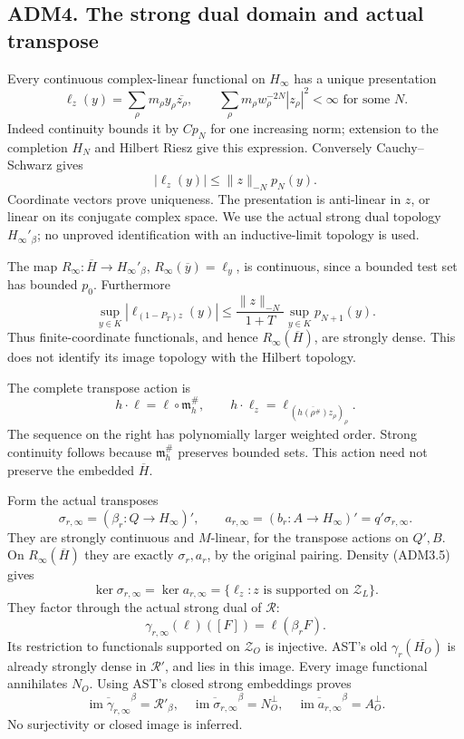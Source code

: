 \subsection{ADM4. The strong dual domain and actual
transpose}\label{adm4.-the-strong-dual-domain-and-actual-transpose}

Every continuous complex-linear functional on \(H_\infty\) has a unique
presentation \[
\ell_z(y)=\sum_\rho m_\rho y_\rho\overline{z_\rho},\qquad
\sum_\rho m_\rho w_\rho^{-2N}|z_\rho|^2<\infty
\text{ for some }N.
\tag{ADM4.1}
\] Indeed continuity bounds it by \(Cp_N\) for one increasing norm;
extension to the completion \(H_N\) and Hilbert Riesz give this
expression. Conversely Cauchy--Schwarz gives \[
|\ell_z(y)|\le\|z\|_{-N}p_N(y).
\tag{ADM4.2}
\] Coordinate vectors prove uniqueness. The presentation is anti-linear
in \(z\), or linear on its conjugate complex space. We use the actual
strong dual topology \(H_\infty'{}_\beta\); no unproved identification
with an inductive-limit topology is used.

The map \(R_\infty:\overline H\to H_\infty'{}_\beta\),
\(R_\infty(\overline y)=\ell_y\), is continuous, since a bounded test
set has bounded \(p_0\). Furthermore \[
\sup_{y\in K}|\ell_{(1-P_T)z}(y)|
\le\frac{\|z\|_{-N}}{1+T}\sup_{y\in K}p_{N+1}(y).
\tag{ADM4.3}
\] Thus finite-coordinate functionals, and hence
\(R_\infty(\overline H)\), are strongly dense. This does not identify
its image topology with the Hilbert topology.

The complete transpose action is \[
h\cdot\ell=\ell\circ\mathfrak m_h^\#,\qquad
h\cdot\ell_z=\ell_{\,(\overline{h(\rho^\#)}z_\rho)_\rho}.
\tag{ADM4.4}
\] The sequence on the right has polynomially larger weighted order.
Strong continuity follows because \(\mathfrak m_h^\#\) preserves bounded
sets. This action need not preserve the embedded \(\overline H\).

Form the actual transposes \[
\sigma_{r,\infty}=(\beta_r:Q\to H_\infty)',\qquad
a_{r,\infty}=(b_r:A\to H_\infty)'=q'\sigma_{r,\infty}.
\tag{ADM4.5}
\] They are strongly continuous and \(M\)-linear, for the transpose
actions on \(Q',B\). On \(R_\infty(\overline H)\) they are exactly
\(\sigma_r,a_r\), by the original pairing. Density (ADM3.5) gives \[
\ker\sigma_{r,\infty}=\ker a_{r,\infty}
=\{\ell_z:z\text{ is supported on }\mathscr Z_L\}.
\tag{ADM4.6}
\] They factor through the actual strong dual of \(\mathcal R\): \[
\gamma_{r,\infty}(\ell)([F])=\ell(\beta_rF).
\tag{ADM4.7}
\] Its restriction to functionals supported on \(\mathscr Z_O\) is
injective. AST's old \(\gamma_r(\overline{H_O})\) is already strongly
dense in \(\mathcal R'\), and lies in this image. Every image functional
annihilates \(N_O\). Using AST's closed strong embeddings proves \[
\overline{\operatorname{im}\gamma_{r,\infty}}^\beta=\mathcal R'_\beta,\quad
\overline{\operatorname{im}\sigma_{r,\infty}}^\beta=N_O^\perp,\quad
\overline{\operatorname{im}a_{r,\infty}}^\beta=A_O^\perp.
\tag{ADM4.8}
\] No surjectivity or closed image is inferred.


